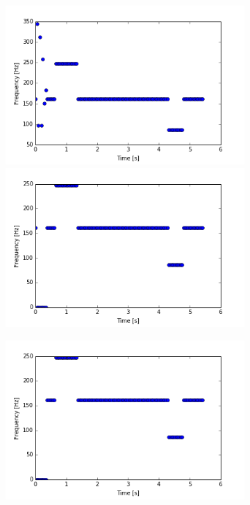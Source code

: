 \begin{figure}[H]
\centering
\begin{subfigure}{0.49\textwidth}
\centering
\includegraphics[width=\textwidth]{figures/peak_detection/peak_lim1.png}
\caption{}
\label{fig:freq_45dB_Amp_pass}

\includegraphics[width=\textwidth]{figures/peak_detection/peak_lim2.png}
\caption{}
\label{fig:freq_65dB_Amp_pass}

\end{subfigure}
\begin{subfigure}{0.49\textwidth}
\centering
\includegraphics[width=\textwidth]{figures/peak_detection/peak_lim3.png}
\caption{}
\label{fig:freq_75dB_Amp_pass}


\end{subfigure}
\end{figure}
